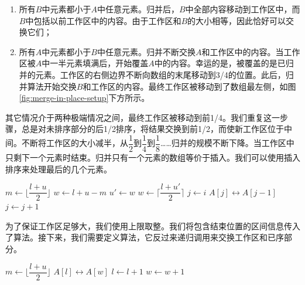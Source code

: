 \documentclass[b5paper]{ctexart}
\begin{document}
\begin{enumerate}
\item 所有$B$中元素都小于$A$中任意元素。归并后，$B$中全部内容移动到工作区中，而$B$中包括以前工作区中的内容。由于工作区和$B$的大小相等，因此恰好可以交换它们；
\item 所有$A$中元素都小于$B$中任意元素。归并不断交换$A$和工作区中的内容。当工作区被$A$中一半元素填满后，开始覆盖$A$中的内容。幸运的是，被覆盖的是已归并的元素。工作区的右侧边界不断向数组的末尾移动到3/4的位置。此后，归并算法开始交换$B$和工作区的内容。最终工作区被移动到了数组最左侧，如图\cref{fig:merge-in-place-setup}下方所示。
\end{enumerate}

其它情况介于两种极端情况之间，最终工作区被移动到前1/4。我们重复这一步骤，总是对未排序部分的后1/2排序，将结果交换到前1/2，而使新工作区位于中间。不断将工作区的大小减半，从$\dfrac{1}{2}$到$\dfrac{1}{4}$到$\dfrac{1}{8}$……归并的规模不断下降。当工作区中只剩下一个元素时结束。归并只有一个元素的数组等价于插入。我们可以使用插入排序来处理最后的几个元素。

\begin{algorithmic}[1]
    \State $m \gets \lfloor \dfrac{l + u}{2} \rfloor$
    \State $w \gets l + u - m$
    \State {} 
      \State $u' \gets w$
      \State $w \gets \lceil \dfrac{l + u'}{2} \rceil$ 
      \State {} 
      \State \Call{Merge}{$A, [l, l + u' - w), [u', u), w$}
    \EndWhile
     
      \State $j \gets i$
        \State {} $A[j] \leftrightarrow A[j-1]$
        \State $j \gets j + 1$
      \EndWhile
    \EndFor
  \EndIf
\EndProcedure
\end{algorithmic}

为了保证工作区足够大，我们使用上限取整。我们将包含结束位置的区间信息传入了算法。接下来，我们需要定义算法，它反过来递归调用来交换工作区和已序部分。

\begin{algorithmic}[1]
    \State $m \gets \lfloor \dfrac{l + u}{2} \rfloor$
    \State {}
    \State {}
    \State \Call{Merge}{$A, [l, m), [m+1, u), w$}
  \Else {}
      \State {} $A[l] \leftrightarrow A[w]$
      \State $l \gets l + 1$
      \State $w \gets w + 1$
    \EndWhile
  \EndIf
\EndProcedure
\end{algorithmic}
\end{document}

